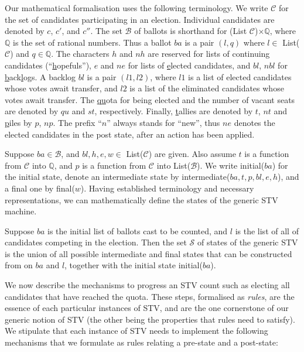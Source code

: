\documentclass{llncs}
\begin{document}
\noindent
Our mathematical formalisation uses the following terminology.  We
write $\mathcal{C}$ for the set of candidates participating in an
election. Individual candidates are denoted by $c$, $c'$, and
$c''$. The set $\mathcal{B}$ of ballots is shorthand for
(\textsf{List} $\mathcal{C}$)$\times\mathbb{Q}$, where $\mathbb{Q}$ is
the set of rational numbers. Thus a ballot $\mathit{ba}$ is a pair
$(l,q)$ where $l\in$ \textsf{List}($\mathcal{C}$) and
$q\in\mathbb{Q}$. The characters $h$ and $nh$ are reserved for lists
of continuing candidates (``\underline{h}opefuls''), $e$ and $ne$ for lists of
\underline{e}lected candidates, and $bl$, $nbl$ for
\underline{b}ack\underline{l}ogs. 
A backlog $bl$ is a
pair $(l1,l2)$, where $l1$ is a list of elected candidates
whose votes await transfer, and $l2$ is a list of the
eliminated candidates whose votes await transfer. The \underline{qu}ota for being
elected and the number of vacant seats are denoted by $qu$ and $st$,
respectively. Finally, \underline{t}allies are denoted by $t$, $nt$ and \underline{p}iles by
$p$, $np$.  
The prefix ``$n$'' always stands for ``new'', 
thus $\mathit{ne}$ denotes the elected candidates in the post state,
after an action has been applied.


Suppose $ba \in\mathcal{B}$, and $bl , h, e, w \in$
\textsf{List}($\mathcal{C}$) are given. Also assume $t$ is a
function from $\mathcal{C}$ into $\mathbb{Q}$, and $p$ is a function
from $\mathcal{C}$ into \textsf{List}($\mathcal{B}$). We write
\textsf{initial}($ba$) for the initial state, denote an intermediate state by
\textsf{intermediate}($ba, t, p, bl, e, h$), and a final one by
\textsf{final}($w$). Having established terminology and necessary
representations, we can mathematically define the states of the
generic STV machine.  
\begin{definition}\label{stv:states}
Suppose $ba$ is the initial list of ballots cast to be counted, and
$l$ is the list of all of candidates competing in the election. Then
the set $\mathcal{S}$ of states of the generic STV is the union of
all 
possible intermediate and final states that can be constructed from on $ba$ and $l$,
together with the initial state \textsf{initial}($ba$).
\end{definition}
\noindent
We now describe the mechanisms to progress an STV count such as
electing all candidates that have reached the quota. 
These steps, formalised as \emph{rules},  are the essence of each particular instances of 
STV, and are the one cornerstone of our generic notion of STV (the
other being the properties that rules need to satisfy). We stipulate
that each instance of STV needs to implement the following
mechanisms that we formulate as rules relating a pre-state and a
post-state:
\end{document}
